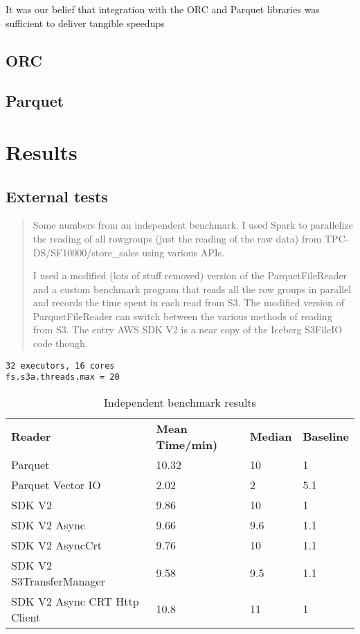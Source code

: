 \documentclass[conference]{IEEEtran}
\begin{document}
It was our belief that integration with the ORC and Parquet libraries was
sufficient to deliver tangible speedups
\subsection{ORC}
\subsection{Parquet}



\section{Results}
\label{sec:results}

\subsection{External tests}

\begin{quotation}
 Some numbers from an independent benchmark.
 I used Spark to parallelize the reading of all rowgroups (just the reading of the raw data)
 from TPC-DS/SF10000/store_sales using various APIs.

I used a modified (lots of stuff removed) version of the ParquetFileReader and a custom
benchmark program that reads all the row groups in parallel and records the time spent in each read from S3.
The modified version of ParquetFileReader can switch between the various methods of reading from S3.
The entry AWS SDK V2 is a near copy of the Iceberg S3FileIO code though.

\end{quotation}

\begin{verbatim}
32 executors, 16 cores
fs.s3a.threads.max = 20
\end{verbatim}

\begin{table}
  \begin{tabular}{ l l l l }
    \hline
    \textbf{Reader} & \textbf{Mean Time/min)} & \textbf{Median} & \textbf{Baseline}\\
    Parquet	& 10.32	& 10 & 1 \\
    Parquet Vector IO	& 2.02 & 2	& 5.1 \\
    SDK V2 & 9.86 & 10 & 1 \\
    SDK V2 Async & 9.66	& 9.6 & 1.1 \\
    SDK V2 AsyncCrt	& 9.76 & 10 & 1.1 \\
    SDK V2 S3TransferManager & 9.58 & 9.5 & 1.1 \\
    SDK V2 Async CRT Http Client & 10.8 & 11 & 1 \\
    \hline
  \end{tabular}
\caption{Independent benchmark results}
\label{tab:independent-benchmark-results}
\end{table}
\end{document}
